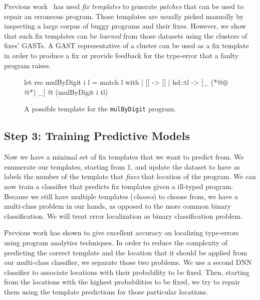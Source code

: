 Previous work~\citep[][]{martinez2013automatically,
martinez2015mining} has used \emph{fix templates} to generate \emph{patches}
that can be used to repair an erroneous program. Those templates are usually
picked manually by inspecting a large corpus of buggy programs and their fixes.
However, we show that such fix templates can be \emph{learned} from those
datasets using the clusters of fixes' GASTs. A GAST representative of a cluster
can be used as a fix template in order to produce a fix or provide feedback for
the type-error that a faulty program raises.


\begin{figure}[ht]
\begin{ecode}
let rec mulByDigit i l =
  match l with
  | []     -> []
  | hd::tl -> [_ (*@$\oplus$@*) _] @ (mulByDigit i tl)
\end{ecode}
\caption{A possible template for the \texttt{mulByDigit} program.}
\label{fig:suggestion}
\end{figure}



\subsection{Step 3: Training Predictive Models}
\label{subsec:step3}

Now we have a minimal set of fix templates that we want to predict from. We
enumerate our templates, starting from 1, and update the dataset to have as
labels the number of the template that \emph{fixes} that location of the
program. We can now train a classifier that predicts fix templates given a
ill-typed program. Because we still have multiple templates (\emph{classes}) to
choose from, we have a multi-class problem in our hands, as opposed to the more
common binary classification. We will treat error localization as binary
classification problem.

 Previous work has shown to give excellent accuracy
on localizing type-errors using program analytics techniques. In order to reduce
the complexity of predicting the correct template and the location that it
should be applied from our multi-class classifier, we separate those two
problems. We use a second DNN classifier to associate locations with their
probability to be fixed. Then, starting from the locations with the highest
probabilities to be fixed, we try to repair them using the template predictions
for those particular locations.

